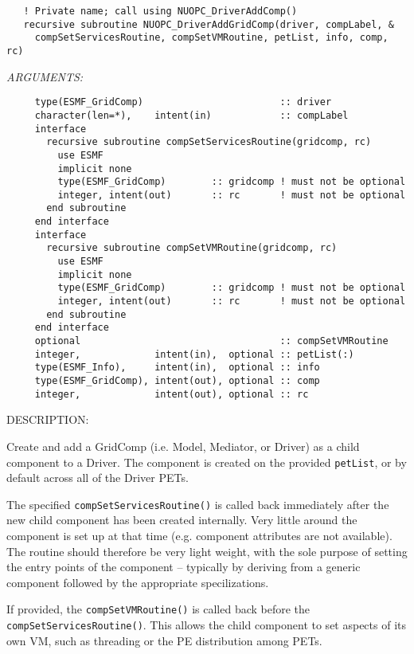   
\begin{verbatim}   ! Private name; call using NUOPC_DriverAddComp()
   recursive subroutine NUOPC_DriverAddGridComp(driver, compLabel, &
     compSetServicesRoutine, compSetVMRoutine, petList, info, comp, rc)\end{verbatim}{\em ARGUMENTS:}
\begin{verbatim}     type(ESMF_GridComp)                        :: driver
     character(len=*),    intent(in)            :: compLabel
     interface
       recursive subroutine compSetServicesRoutine(gridcomp, rc)
         use ESMF
         implicit none
         type(ESMF_GridComp)        :: gridcomp ! must not be optional
         integer, intent(out)       :: rc       ! must not be optional
       end subroutine
     end interface
     interface
       recursive subroutine compSetVMRoutine(gridcomp, rc)
         use ESMF
         implicit none
         type(ESMF_GridComp)        :: gridcomp ! must not be optional
         integer, intent(out)       :: rc       ! must not be optional
       end subroutine
     end interface
     optional                                   :: compSetVMRoutine
     integer,             intent(in),  optional :: petList(:)
     type(ESMF_Info),     intent(in),  optional :: info
     type(ESMF_GridComp), intent(out), optional :: comp
     integer,             intent(out), optional :: rc \end{verbatim}
{\sf DESCRIPTION:\\ }


   Create and add a GridComp (i.e. Model, Mediator, or Driver) as a child 
   component to a Driver. The component is created on the provided {\tt petList},
   or by default across all of the Driver PETs.
  
   The specified {\tt compSetServicesRoutine()} is called back immediately after
   the new child component has been created internally. Very little around the
   component is set up at that time (e.g. component attributes are not 
   available). The routine should therefore be very light weight, with the sole
   purpose of setting the entry points of the component -- typically by deriving 
   from a generic component followed by the appropriate specilizations.
  
   If provided, the {\tt compSetVMRoutine()} is called back before the 
   {\tt compSetServicesRoutine()}. This allows the child component to set
   aspects of its own VM, such as threading or the PE distribution among PETs.
  
